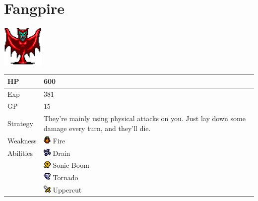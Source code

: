 \section{Fangpire}
\label{monster:fangpire}

\includegraphics[height=2cm,keepaspectratio]{./resources/monster/fangpire}

\begin{longtable}{ l p{9cm} }
	HP
	& 600
\\ \hline
	Exp
	& 381
\\ \hline
	GP
	& 15
\\ \hline
	Strategy
	& They're mainly using physical attacks on you. Just lay down some damage every turn, and they'll die.
\\ \hline
	Weakness
	& \includegraphics[height=1em,keepaspectratio]{./resources/effects/fire} Fire
\\ \hline
	Abilities
	& \includegraphics[height=1em,keepaspectratio]{./resources/effects/drain} Drain \\
	& \includegraphics[height=1em,keepaspectratio]{./resources/effects/confusion} Sonic Boom \\
	& \includegraphics[height=1em,keepaspectratio]{./resources/effects/wind} Tornado \\
	& \includegraphics[height=1em,keepaspectratio]{./resources/effects/damage} Uppercut
\end{longtable}
